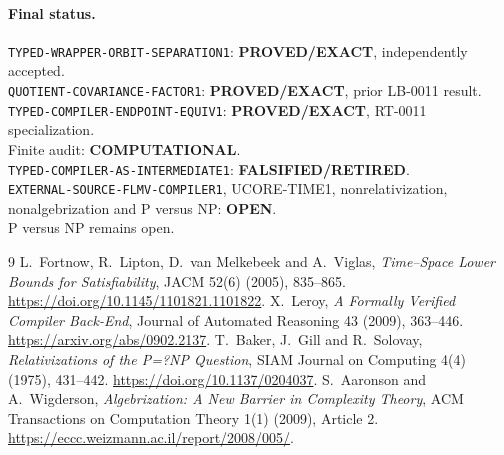 \documentclass[11pt]{article}
\newcommand{\EXACT}{\textbf{PROVED/EXACT}}
\newcommand{\OPEN}{\textbf{OPEN}}
\newcommand{\RETIRED}{\textbf{FALSIFIED/RETIRED}}
\newcommand{\COMP}{\textbf{COMPUTATIONAL}}
\begin{document}
\paragraph{Final status.}
\texttt{TYPED-WRAPPER-ORBIT-SEPARATION1}: \EXACT, independently accepted.\\
\texttt{QUOTIENT-COVARIANCE-FACTOR1}: \EXACT, prior LB-0011 result.\\
\texttt{TYPED-COMPILER-ENDPOINT-EQUIV1}: \EXACT, RT-0011 specialization.\\
Finite audit: \COMP.\\
\texttt{TYPED-COMPILER-AS-INTERMEDIATE1}: \RETIRED.\\
\texttt{EXTERNAL-SOURCE-FLMV-COMPILER1}, UCORE-TIME1,
nonrelativization, nonalgebrization and P versus NP: \OPEN.\\
P versus NP remains open.

\begin{thebibliography}{9}
 L.~Fortnow, R.~Lipton, D.~van Melkebeek and A.~Viglas,
\emph{Time--Space Lower Bounds for Satisfiability}, JACM 52(6) (2005),
835--865. \url{https://doi.org/10.1145/1101821.1101822}.
 X.~Leroy,
\emph{A Formally Verified Compiler Back-End},
Journal of Automated Reasoning 43 (2009), 363--446.
\url{https://arxiv.org/abs/0902.2137}.
 T.~Baker, J.~Gill and R.~Solovay,
\emph{Relativizations of the P=?NP Question}, SIAM Journal on Computing
4(4) (1975), 431--442. \url{https://doi.org/10.1137/0204037}.
 S.~Aaronson and A.~Wigderson,
\emph{Algebrization: A New Barrier in Complexity Theory},
ACM Transactions on Computation Theory 1(1) (2009), Article 2.
\url{https://eccc.weizmann.ac.il/report/2008/005/}.
\end{thebibliography}

\end{document}
